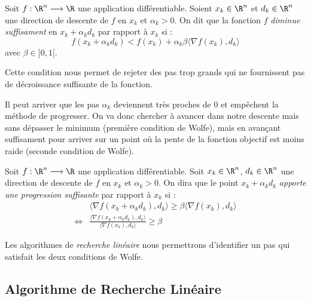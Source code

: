 \begin{definition}
    Soit $f : \R^n \longrightarrow \R$ une application différentiable. Soient $x_k \in \R^n$ 
    et $d_k \in \R^n$ une direction de descente de $f$ en $x_k$ et $ \alpha_k > 0$. 
    On dit que la fonction $f$ \emph{diminue suffisament} en $x_k + \alpha_k d_k$ par rapport à $x_k$ si : 
        \begin{equation}
            {f(x_k + \alpha_k d_k) < f(x_k) + \alpha_k \beta \langle \nabla f(x_k), d_k \rangle}
        \end{equation}
    avec $ \beta \in ]0,1[$. 
\end{definition}

Cette condition nous permet de rejeter des pas trop grands qui ne fournissent pas de décroissance suffisante de 
la fonction. 

Il peut arriver que les pas $ \alpha_k$ deviennent très proches de 0 et empêchent la méthode de progresser. 
On va donc chercher à avancer dans notre descente mais sans dépasser le minimum (première condition de Wolfe), mais 
en avançant suffisament pour arriver sur un point où la pente de la fonction objectif est moins raide (seconde condition 
de Wolfe). 

\begin{definition}
    Soit $f : \R^n \longrightarrow \R$ une application différentiable. Soit $x_k \in \R^n$, 
    $d_k \in \R^n$ une direction de descente de $f$ en $x_k$ et $ \alpha_k > 0$. 
    On dira que le point $x_k + \alpha_k d_k$ \emph{apporte une progression suffisante} par rapport 
    à $x_k$ si : 
        \begin{align}
            & \langle \nabla f(x_k + \alpha_k d_k), d_k \rangle \geqslant \beta \langle \nabla f(x_k), d_k \rangle \\[1em]
            \iff & \frac{ \langle \nabla f(x_k + \alpha_k d_k), d_k \rangle}{\langle \nabla f(x_k), d_k \rangle} \geqslant \beta
        \end{align}
\end{definition}

Les algorithmes de \emph{recherche linéaire} nous permettrons d'identifier un pas qui satisfait les deux conditions de Wolfe. 

\subsection{Algorithme de Recherche Linéaire}

